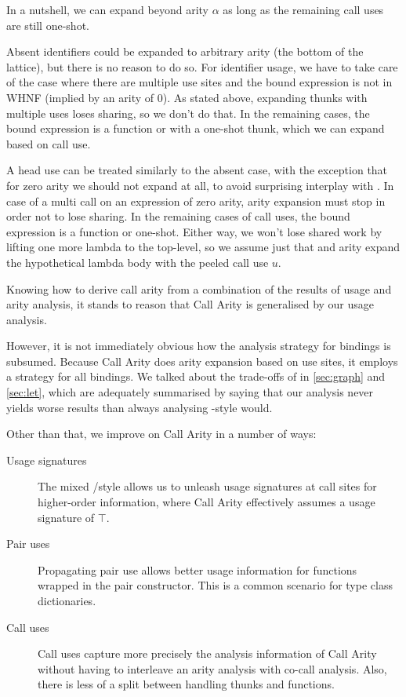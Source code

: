 In a nutshell, we can expand beyond arity $\alpha$ as long as the remaining call uses are still one-shot.\smallskip

Absent identifiers could be expanded to arbitrary arity (\eg the bottom of the lattice), but there is no reason to do so.
For identifier usage, we have to take care of the case where there are multiple use sites and the bound expression is not in WHNF (implied by an arity of 0). 
As stated above, expanding thunks with multiple uses loses sharing, so we don't do that.
In the remaining cases, the bound expression is a function or with a one-shot thunk, which we can expand based on call use.

A head use can be treated similarly to the absent case, with the exception that for zero arity we should not expand at all, to avoid surprising interplay with .
In case of a multi call on an expression of zero arity, arity expansion must stop in order not to lose sharing.
In the remaining cases of call uses, the bound expression is a function or one-shot.
Either way, we won't lose shared work by lifting one more lambda to the top-level, so we assume just that and arity expand the hypothetical lambda body with the peeled call use $u$.\medskip

Knowing how to derive call arity from a combination of the results of usage and arity analysis, it stands to reason that Call Arity is generalised by our usage analysis.

However, it is not immediately obvious how the analysis strategy for  bindings is subsumed.
Because Call Arity does arity expansion based on use sites, it employs a  strategy for all bindings.
We talked about the trade-offs of  \vs {} in \cref{sec:graph} and \cref{sec:let}, which are adequately summarised by saying that our analysis never yields worse results than always analysing -style would.

Other than that, we improve on Call Arity in a number of ways:

\begin{description}
  \item[Usage signatures] The mixed / style allows us to unleash usage signatures at call sites for higher-order information, where Call Arity effectively assumes a usage signature of $\top$.
  \item[Pair uses] Propagating pair use allows better usage information for functions wrapped in the pair constructor. This is a common scenario for type class dictionaries.
  \item[Call uses] Call uses capture more precisely the analysis information of Call Arity without having to interleave an arity analysis with co-call analysis. Also, there is less of a split between handling thunks and functions.
\end{description}

